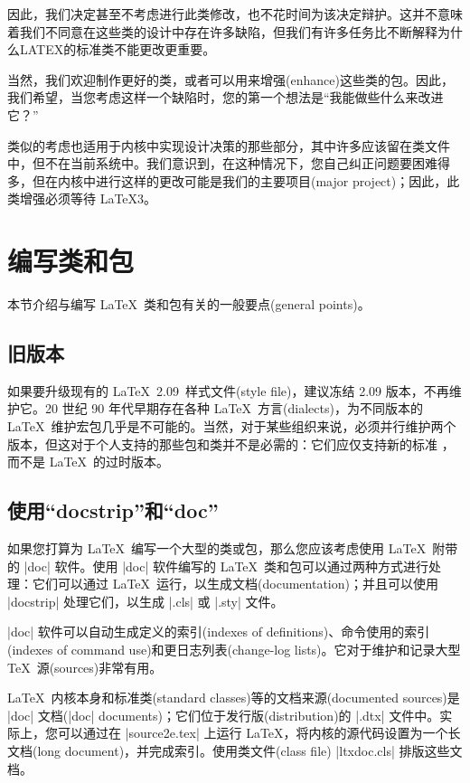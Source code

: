 \documentclass{ltxguide}[1995/11/28]
\begin{document}
因此，我们决定甚至不考虑进行此类修改，也不花时间为该决定辩护。这并不意味着我们不同意在这些类的设计中存在许多缺陷，但我们有许多任务比不断解释为什么LATEX的标准类不能更改更重要。

当然，我们欢迎制作更好的类，或者可以用来增强(enhance)这些类的包。因此，我们希望，当您考虑这样一个缺陷时，您的第一个想法是“我能做些什么来改进它？”

类似的考虑也适用于内核中实现设计决策的那些部分，其中许多应该留在类文件中，但不在当前系统中。我们意识到，在这种情况下，您自己纠正问题要困难得多，但在内核中进行这样的更改可能是我们的主要项目(major project)；因此，此类增强必须等待 \LaTeX3。

\newpage


\section{\heiti 编写类和包}
\label{Sec:writing}

本节介绍与编写 \LaTeX{}\ 类和包有关的一般要点(general points)。


\subsection[旧版本]{\heiti 旧版本}

如果要升级现有的 \LaTeX~2.09\ 样式文件(style file)，建议冻结 2.09 版本，不再维护它。20 世纪 90 年代早期存在各种 \LaTeX{}\ 方言(dialects)，为不同版本的 \LaTeX{}\ 维护宏包几乎是不可能的。当然，对于某些组织来说，必须并行维护两个版本，但这对于个人支持的那些包和类并不是必需的：它们应仅支持新的标准 \LaTeXe{}，而不是 \LaTeX{}\ 的过时版本。


\subsection[使用“docstrip”和“doc”]{\heiti 使用“docstrip”和“doc”}

如果您打算为 \LaTeX{}\ 编写一个大型的类或包，那么您应该考虑使用 \LaTeX{}\ 附带的 |doc| 软件。使用 |doc| 软件编写的 \LaTeX{}\ 类和包可以通过两种方式进行处理：它们可以通过 \LaTeX{}\ 运行，以生成文档(documentation)；并且可以使用 |docstrip| 处理它们，以生成 |.cls| 或 |.sty| 文件。

|doc| 软件可以自动生成定义的索引(indexes of definitions)、命令使用的索引(indexes of command use)和更日志列表(change-log lists)。它对于维护和记录大型 \TeX{}\ 源(sources)非常有用。

\LaTeX{}\ 内核本身和标准类(standard classes)等的文档来源(documented sources)是 |doc| 文档(|doc| documents)；它们位于发行版(distribution)的 |.dtx| 文件中。实际上，您可以通过在 |source2e.tex| 上运行 \LaTeX{}，将内核的源代码设置为一个长文档(long document)，并完成索引。使用类文件(class file) |ltxdoc.cls| 排版这些文档。
\end{document}
